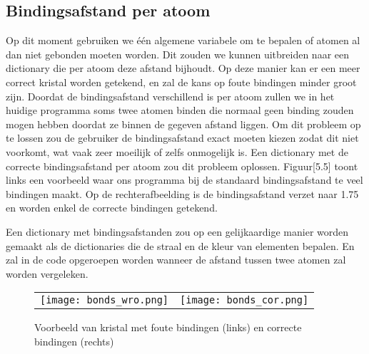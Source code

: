 \subsection{Bindingsafstand per atoom}
Op dit moment gebruiken we één algemene variabele om te bepalen of atomen al dan niet gebonden moeten worden. Dit zouden we kunnen uitbreiden naar een dictionary die per atoom deze afstand bijhoudt. Op deze manier kan er een meer correct kristal worden getekend, en zal de kans op foute bindingen minder groot zijn. Doordat de bindingsafstand verschillend is per atoom zullen we in het huidige programma soms twee atomen binden die normaal geen binding zouden mogen hebben doordat ze binnen de gegeven afstand liggen. Om dit probleem op te lossen zou de gebruiker de bindingsafstand exact moeten kiezen zodat dit niet voorkomt, wat vaak zeer moeilijk of zelfs onmogelijk is. Een dictionary met de correcte bindingsafstand per atoom zou dit probleem oplossen. Figuur[5.5] toont links een voorbeeld waar ons programma bij de standaard bindingsafstand te veel bindingen maakt. Op de rechterafbeelding is de bindingsafstand verzet naar 1.75 en worden enkel de correcte bindingen getekend.
\par
Een dictionary met bindingsafstanden zou op een gelijkaardige manier worden gemaakt als de dictionaries die de straal en de kleur van elementen bepalen. En zal in de code opgeroepen worden wanneer de afstand tussen twee atomen zal worden vergeleken.
\begin{figure}[H]
\begin{center}
\begin{tabular}{l|l}

\texttt{[image: bonds\_wro.png]}
&
\texttt{[image: bonds\_cor.png]}

\end{tabular}
\end{center}
\caption{Voorbeeld van kristal met foute bindingen (links) en correcte bindingen (rechts)}
\end{figure}
    

